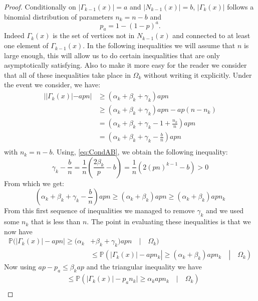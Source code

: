 \begin{proof}
	Conditionally on $|\Gamma_{k-1}(x)| = a$ and $|N_{k-1}(x)| = b$, $|\Gamma_k(x)|$ follows a binomial distribution of parameters $n_k = n-b$ and
	\begin{equation}
		p_a = 1 - (1-p)^a.
	\end{equation}
	Indeed $\Gamma_k(x)$ is the set of vertices not in $N_{k-1}(x)$ and connected to at least one element of $\Gamma_{k-1}(x)$.
	\newline
	In the following inequalities we will assume that $n$ is large enough, this will allow us to do certain inequalities that are only asymptotically satisfying. Also to make it more easy for the reader we consider that all of these inequalities take place in $\Omega_k$ without writing it explicitly.
	Under the event we consider, we have:
	\begin{align}
		||\Gamma_k(x)| - apn| &\geq (\alpha_k + \beta_k + \gamma_k)apn \\
		 &\geq (\alpha_k + \beta_k + \gamma_k)apn - ap(n -n_k) \\
		 &= (\alpha_k + \beta_k + \gamma_k - 1 + \frac{n_k}{n})apn \\ 
		 &= (\alpha_k + \beta_k + \gamma_k - \frac{b}{n})apn \\  
	\end{align}
	with $n_k = n-b$.
	Using, \eqref{eq:CondAB}, we obtain the following inequality:
	\begin{equation}
		\gamma_k - \frac{b}{n} = \frac{1}{n}(\frac{2\beta_k}{p} - b) = \frac{1}{n}(2(pn)^{k-1} -b) > 0
	\end{equation}
	From which we get:
	\begin{equation}
		 (\alpha_k + \beta_k + \gamma_k - \frac{b}{n})apn \geq (\alpha_k + \beta_k)apn \geq (\alpha_k + \beta_k)apn_k  
	\end{equation}
	From this first sequence of inequalities we managed to remove $\gamma_k$ and we used some $n_k$ that is less than $n$.
	The point in evaluating these inequalities is that we now have
	\begin{align}
		\mathbb{P}(|\Gamma_k(x)| - apn| \geq (\alpha_k &+ \beta_k + \gamma_k)apn \quad|\quad \Omega_k) \\&\leq \mathbb{P}(|\Gamma_k(x)| - apn_k| \geq (\alpha_k + \beta_k )apn_k \quad|\quad \Omega_k)
	\end{align}
	Now using $ap -p_a \leq \beta_k ap$ and the triangular inequality we have
	\begin{align}
		&\leq \mathbb{P}(|\Gamma_k(x)| - p_an_k| \geq \alpha_k apn_k \quad|\quad \Omega_k)\\

\end{align}
\end{proof}
